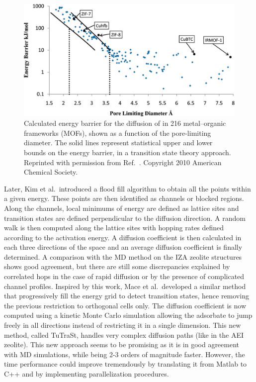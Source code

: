 \documentclass[main.tex]{subfiles}
\begin{document}
\begin{figure}[ht]
\centering
  \includegraphics[width=0.7\linewidth]{figures/1-screening/Haldoupis_2010.jpeg}
  \caption{Calculated energy barrier for the diffusion of  in 216 metal--organic frameworks (MOFs), shown as a function of the pore-limiting diameter. The solid lines represent statistical upper and lower bounds on the energy barrier, in a transition state theory approach. Reprinted with permission from Ref.~. Copyright 2010 American Chemical Society.}
  \label{fgr:Haldoupis_2010}
\end{figure}

Later, Kim et al.\ introduced a flood fill algorithm to obtain all the points within a given energy.\cite{Kim_2013} These points are then identified as channels or blocked regions. Along the channels, local minimums of energy are defined as lattice sites and transition states are defined perpendicular to the diffusion direction. A random walk is then computed along the lattice sites with hopping rates defined according to the activation energy. A diffusion coefficient is then calculated in each three directions of the space and an average diffusion coefficient is finally determined.
A comparison with the MD method on the IZA zeolite structures shows good agreement, but there are still some discrepancies explained by correlated hops in the case of rapid diffusion or by the presence of complicated channel profiles. Inspired by this work, Mace et al.\ developed a similar method that progressively fill the energy grid to detect transition states, hence removing the previous restriction to orthogonal cells only.\cite{Mace_2019} The diffusion coefficient is now computed using a kinetic Monte Carlo simulation allowing the adsorbate to jump freely in all directions instead of restricting it in a single dimension. This new method, called TuTraSt, handles very complex diffusion paths (like in the AEI zeolite). This new approach seems to be promising as it is in good agreement with MD simulations, while being 2-3 orders of magnitude faster. However, the time performance could improve tremendously by translating it from Matlab to C++ and by implementing parallelization procedures.
\end{document}
